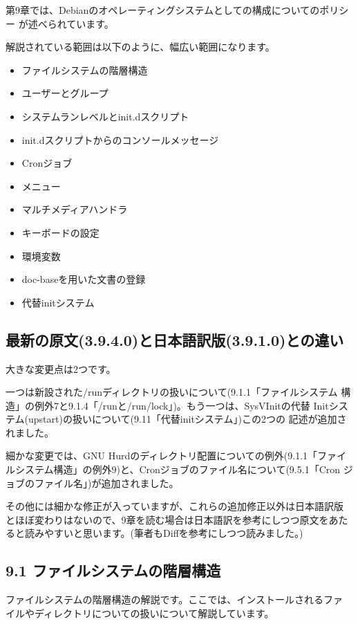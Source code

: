 \documentclass[mingoth,a4paper]{jsarticle}
\begin{document}
第9章では、Debianのオペレーティングシステムとしての構成についてのポリシー
が述べられています。

解説されている範囲は以下のように、幅広い範囲になります。

\begin{itemize}
\item
  ファイルシステムの階層構造
\item
  ユーザーとグループ
\item
  システムランレベルとinit.dスクリプト
\item
  init.dスクリプトからのコンソールメッセージ
\item
  Cronジョブ
\item
  メニュー
\item
  マルチメディアハンドラ
\item
  キーボードの設定
\item
  環境変数
\item
  doc-baseを用いた文書の登録
\item
  代替initシステム
\end{itemize}


\subsection{最新の原文(3.9.4.0)と日本語訳版(3.9.1.0)との違い}

大きな変更点は2つです。

一つは新設された/runディレクトリの扱いについて(9.1.1「ファイルシステム
構造」の例外7と9.1.4「/runと/run/lock」)。もう一つは、SysVInitの代替
Initシステム(upstart)の扱いについて(9.11「代替initシステム」)この2つの
記述が追加されました。

細かな変更では、GNU Hurdのディレクトリ配置についての例外(9.1.1「ファイ
ルシステム構造」の例外9)と、Cronジョブのファイル名について(9.5.1「Cron
ジョブのファイル名」)が追加されました。

その他には細かな修正が入っていますが、これらの追加修正以外は日本語訳版
とほぼ変わりはないので、9章を読む場合は日本語訳を参考にしつつ原文をあた
ると読みやすいと思います。(筆者もDiffを参考にしつつ読みました。)

\subsection{9.1 ファイルシステムの階層構造}

ファイルシステムの階層構造の解説です。ここでは、インストールされるファ
イルやディレクトリについての扱いについて解説しています。
\end{document}
